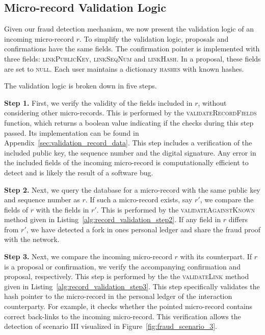 \subsection{Micro-record Validation Logic}
\label{sec:validation_logic}
Given our fraud detection mechanism, we now present the validation logic of an incoming micro-record $ r $.
To simplify the validation logic, proposals and confirmations have the same fields.
The confirmation pointer is implemented with three fields: \textsc{linkPublicKey}, \textsc{linkSeqNum} and \textsc{linkHash}.
In a proposal, these fields are set to \textsc{null}.
Each user maintains a dictionary \textsc{hashes} with known hashes.

The validation logic is broken down in five steps.

\textbf{Step 1.}
First, we verify the validity of the fields included in $ r $, without considering other micro-records.
This is performed by the \textsc{validateRecordFields} function, which returns a boolean value indicating if the checks during this step passed.
Its implementation can be found in Appendix~\ref{sec:validation_record_data}.
This step includes a verification of the included public key, the sequence number and the digital signature.
Any error in the included fields of the incoming micro-record is computationally efficient to detect and is likely the result of a software bug.

\textbf{Step 2.}
Next, we query the database for a micro-record with the same public key and sequence number as $ r $.
If such a micro-record exists, say $ r' $, we compare the fields of $ r $ with the fields in $ r' $.
This is performed by the \textsc{validateAgainstKnown} method given in Listing~\ref{alg:record_validation_step2}.
If any field in $ r $ differs from $ r' $, we have detected a fork in ones personal ledger and share the fraud proof with the network.

\textbf{Step 3.}
Next, we compare the incoming micro-record $ r $ with its counterpart.
If $ r $ is a proposal or confirmation, we verify the accompanying confirmation and proposal, respectively.
This step is performed by the the \textsc{validateLink} method given in Listing~\ref{alg:record_validation_step3}.
This step specifically validates the hash pointer to the micro-record in the personal ledger of the interaction counterparty.
For example, it checks whether the pointed micro-record contains correct back-links to the incoming micro-record.
This verification allows the detection of scenario III visualized in Figure~\ref{fig:fraud_scenario_3}.

